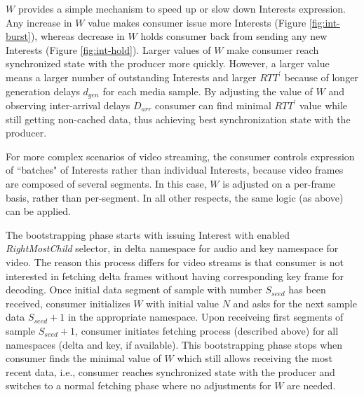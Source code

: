 \documentclass{icn/sig-alternate-2012} %
\begin{document}
$W$ provides a simple mechanism to speed up or slow down Interests expression. Any increase in $W$ value makes consumer issue more Interests (Figure \ref{fig:int-burst}), whereas decrease in $W$ holds consumer back from sending any new Interests (Figure \ref{fig:int-hold}). Larger values of $W$ make consumer reach synchronized state with the producer more quickly. However, a larger value means a larger number of outstanding Interests and larger $RTT^\prime$ because of longer generation delays $d_{gen}$ for each media sample. By adjusting the value of $W$ and observing inter-arrival delays $D_{arr}$ consumer can find minimal $RTT^\prime$ value while still getting non-cached data, thus achieving best synchronization state with the producer.

For more complex scenarios of video streaming, the consumer controls expression of ``batches" of Interests rather than individual Interests, because video frames are composed of several segments. In this case, $W$ is adjusted on a per-frame basis, rather than per-segment. In all other respects, the same logic (as above) can be applied.

The bootstrapping phase starts with issuing Interest with enabled \textit{RightMostChild} selector, in delta namespace for audio and key namespace for video. The reason this process differs for video streams is that consumer is not interested in fetching delta frames without having corresponding key frame for decoding. Once initial data segment of sample with number $S_{seed}$ has been received, consumer initializes $W$ with initial value $N$ and asks for the next sample data $S_{seed}+1$ in the appropriate namespace. Upon receiveing first segments of sample $S_{seed}+1$, consumer initiates fetching process (described above) for all namespaces (delta and key, if available). This bootstrapping phase stops when consumer finds the minimal value of $W$ which still allows receiving the most recent data, i.e., consumer reaches synchronized state with the producer and switches to a normal fetching phase where no adjustments for $W$ are needed. 



\end{document}
